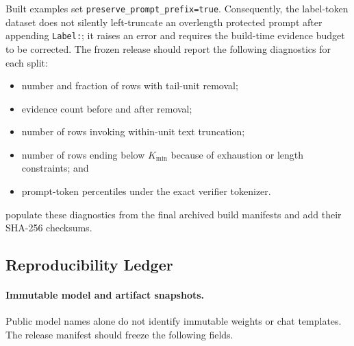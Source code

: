 Built examples set \texttt{preserve\_prompt\_prefix=true}.  Consequently,
the label-token dataset does not silently left-truncate an overlength
protected prompt after appending \texttt{Label:}; it raises an error and
requires the build-time evidence budget to be corrected.  The frozen
release should report the following diagnostics for each split:
\begin{itemize}
    \item number and fraction of rows with tail-unit removal;
    \item evidence count before and after removal;
    \item number of rows invoking within-unit text truncation;
    \item number of rows ending below $K_{\min}$ because of exhaustion or
    length constraints; and
    \item prompt-token percentiles under the exact verifier tokenizer.
\end{itemize}
\noindent\todoauthor populate these diagnostics from the final
archived build manifests and add their SHA-256 checksums.

\subsection{Reproducibility Ledger}
\label{sec:supp-repro-ledger}

\paragraph{Immutable model and artifact snapshots.}
Public model names alone do not identify immutable weights or chat
templates.  The release manifest should freeze the following fields.

